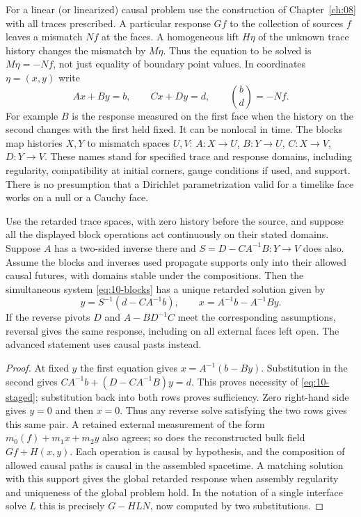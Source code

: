 For a linear (or linearized) causal problem use the construction of Chapter~\ref{ch:08} with all traces prescribed. A particular response $G f$ to the collection of sources $f$ leaves a mismatch $Nf$ at the faces. A homogeneous lift $H\eta$ of the unknown trace history changes the mismatch by $M\eta$. Thus the equation to be solved is $M\eta=-Nf$, not just equality of boundary point values. In coordinates $\eta=(x,y)$ write
\begin{equation}
 A x+B y=b,\qquad C x+D y=d,
 \qquad \binom{b}{d}=-Nf .
 \label{eq:10-blocks}
\end{equation}
For example $B$ is the response measured on the first face when the history on the second changes with the first held fixed. It can be nonlocal in time. The blocks map histories $X,Y$ to mismatch spaces $U,V$: $A:X\to U$, $B:Y\to U$, $C:X\to V$, $D:Y\to V$. These names stand for specified trace and response domains, including regularity, compatibility at initial corners, gauge conditions if used, and support. There is no presumption that a Dirichlet parametrization valid for a timelike face works on a null or a Cauchy face.

\begin{proposition}
Use the retarded trace spaces, with zero history before the source, and suppose all the displayed block operations act continuously on their stated domains. Suppose $A$ has a two-sided inverse there and $S=D-CA^{-1}B:Y\to V$ does also. Assume the blocks and inverses used propagate supports only into their allowed causal futures, with domains stable under the compositions. Then the simultaneous system \eqref{eq:10-blocks} has a unique retarded solution given by
\begin{equation}
 y=S^{-1}(d-CA^{-1}b),\qquad x=A^{-1}b-A^{-1}B y .
 \label{eq:10-staged}
\end{equation}
If the reverse pivots $D$ and $A-BD^{-1}C$ meet the corresponding assumptions, reversal gives the same response, including on all external faces left open. The advanced statement uses causal pasts instead.
\end{proposition}
\begin{proof}
At fixed $y$ the first equation gives $x=A^{-1}(b-B y)$. Substitution in the second gives $C A^{-1}b+(D-CA^{-1}B)y=d$. This proves necessity of \eqref{eq:10-staged}; substitution back into both rows proves sufficiency. Zero right-hand side gives $y=0$ and then $x=0$. Thus any reverse solve satisfying the two rows gives this same pair. A retained external measurement of the form $m_0(f)+m_1 x+m_2 y$ also agrees; so does the reconstructed bulk field $G f+H(x,y)$. Each operation is causal by hypothesis, and the composition of allowed causal paths is causal in the assembled spacetime. A matching solution with this support gives the global retarded response when assembly regularity and uniqueness of the global problem hold. In the notation of a single interface solve $L$ this is precisely $G-HLN$, now computed by two substitutions.
\end{proof}


